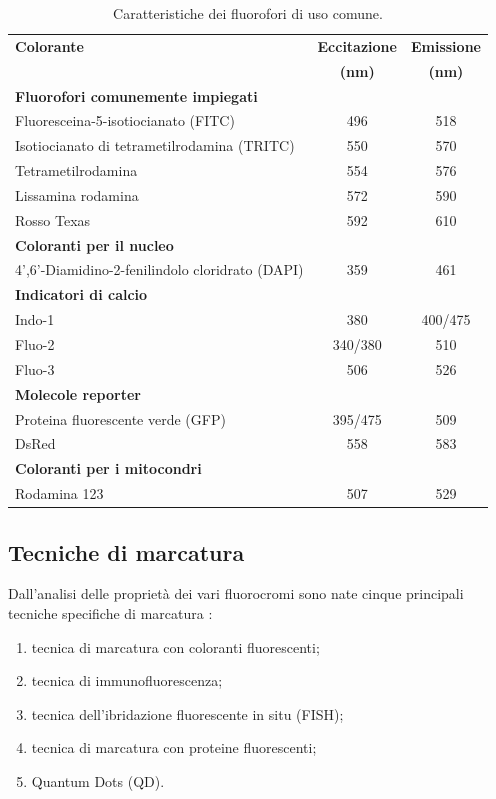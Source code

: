 \begin{table}[!ht]
 \begin{center}
\begin{small}
\begin{tabular}{lcc}
\hline\hline
\textbf{Colorante}&\textbf{Eccitazione}&\textbf{Emissione}\\
&\textbf{\small{(nm)}}&\textbf{\small{(nm)}}\\
\hline
\textbf{Fluorofori comunemente impiegati}&&\\
Fluoresceina-5-isotiocianato (FITC)&496&518\\
Isotiocianato di tetrametilrodamina (TRITC)&550&570\\
Tetrametilrodamina&554&576\\
Lissamina rodamina&572&590\\
Rosso Texas&592&610\\
\hline
\textbf{Coloranti per il nucleo}&&\\
4',6'-Diamidino-2-fenilindolo cloridrato (DAPI)&359&461\\
\hline
\textbf{Indicatori di calcio}&&\\
Indo-1&380&400/475\\
Fluo-2&340/380&510\\
Fluo-3&506&526\\
\hline
\textbf{Molecole reporter}&&\\
Proteina fluorescente verde (GFP)&395/475&509\\
DsRed&558&583\\
\hline
\textbf{Coloranti per i mitocondri}&&\\
Rodamina 123&507&529\\
\hline\hline
\end{tabular}
\caption{\small{Caratteristiche dei fluorofori di uso comune.}}
\label{TABfluo}
\end{small}
\end{center}
\end{table}


\subsection{Tecniche di marcatura}

Dall'analisi delle proprietà dei vari fluorocromi sono nate cinque principali tecniche specifiche di marcatura \cite{tecniche}:
\begin{enumerate}
\item tecnica di marcatura con coloranti fluorescenti;
\item tecnica di immunofluorescenza;
\item tecnica dell'ibridazione fluorescente in situ (FISH);
\item tecnica di marcatura con proteine fluorescenti;
\item Quantum Dots (QD).
\end{enumerate}

